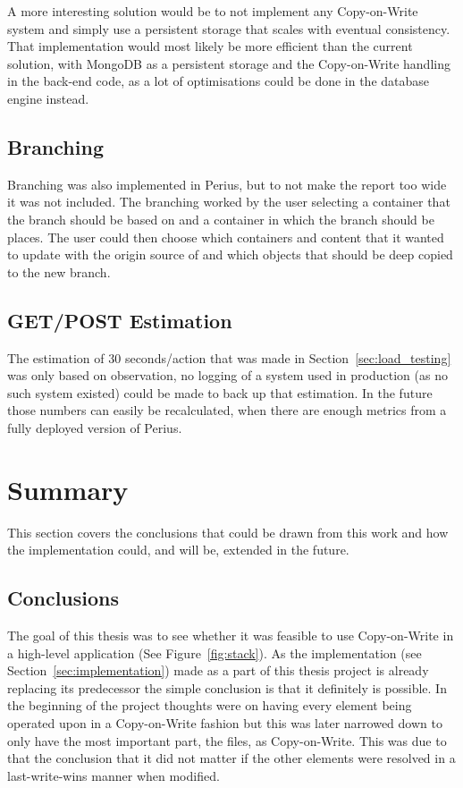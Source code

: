 \documentclass[a4paper,12pt]{article}
\begin{document}
\par A more interesting solution would be to not implement any Copy-on-Write system and simply use 
a persistent storage that scales with eventual consistency. That implementation would most likely be
more efficient than the current solution, with MongoDB as a persistent storage and the Copy-on-Write
handling in the back-end code, as a lot of optimisations could be done in the database engine
instead.

\subsection{Branching}
Branching was also implemented in Perius, but to not make the report too wide it was not included.
The branching worked by the user selecting a container that the branch should be based on and a
container in which the branch should be places. The user could then choose which containers and
content that it wanted to update with the origin source of and which objects that should be deep
copied to the new branch.

\subsection{GET/POST Estimation}
The estimation of 30 seconds/action that was made in Section~\ref{sec:load_testing} was only based
on observation, no logging of a system used in production (as no such system existed) could be made 
to back up that estimation. In the future those numbers can easily be recalculated, when there are
enough metrics from a fully deployed version of Perius.

\newpage
\section{Summary}
This section covers the conclusions that could be drawn from this work and how the implementation 
could, and will be, extended in the future.

\subsection{Conclusions}
The goal of this thesis was to see whether it was feasible to use Copy-on-Write in a high-level
application (See Figure~\ref{fig:stack}). As the implementation (see
Section~\ref{sec:implementation}) made as a part of this thesis project is already replacing its
predecessor the simple conclusion is that it definitely is possible. In the beginning of the project
thoughts were on having every element being operated upon in a Copy-on-Write fashion but this was
later narrowed down to only have the most important part, the files, as Copy-on-Write. This was due
to that the conclusion that it did not matter if the other elements were resolved in a
last-write-wins manner when modified.
\end{document}
